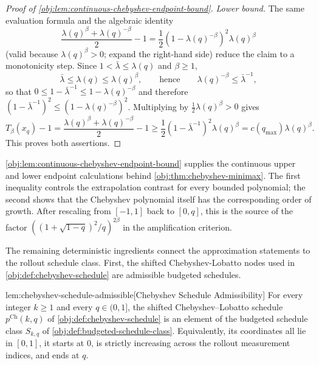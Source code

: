 \documentclass[11pt]{article}
\begin{document}
\begin{proof}[Proof of \cref{obj:lem:continuous-chebyshev-endpoint-bound}]
\emph{Lower bound.}
The same evaluation formula and the algebraic identity
\[
\frac{\lambda(q)^\beta+\lambda(q)^{-\beta}}2-1
=
\frac12\left(1-\lambda(q)^{-\beta}\right)^2\lambda(q)^\beta
\]
(valid because \(\lambda(q)^\beta>0\); expand the right-hand side) reduce the claim to a monotonicity step. Since \(1<\bar{\lambda}\le\lambda(q)\) and \(\beta\ge1\),
\[
\bar{\lambda}\le\lambda(q)\le\lambda(q)^\beta ,
\qquad\text{hence}\qquad
\lambda(q)^{-\beta}\le\bar{\lambda}^{-1},
\]
so that \(0\le 1-\bar{\lambda}^{-1}\le 1-\lambda(q)^{-\beta}\) and therefore \((1-\bar{\lambda}^{-1})^2\le\left(1-\lambda(q)^{-\beta}\right)^2\). Multiplying by \(\tfrac12\lambda(q)^\beta>0\) gives
\[
T_\beta(x_q)-1
=
\frac{\lambda(q)^\beta+\lambda(q)^{-\beta}}2-1
\ge
\frac12(1-\bar{\lambda}^{-1})^2\lambda(q)^\beta
=
c(q_{\max})\lambda(q)^\beta.
\] %
This proves both assertions. %
\end{proof}

\cref{obj:lem:continuous-chebyshev-endpoint-bound} supplies the continuous upper and lower endpoint calculations behind \cref{obj:thm:chebyshev-minimax}. The first inequality controls the extrapolation contrast for every bounded polynomial; the second shows that the Chebyshev polynomial itself has the corresponding order of growth. After rescaling from \([-1,1]\) back to \([0,q]\), this is the source of the factor \(((1+\sqrt{1-q})^2/q)^{2\beta}\) in the amplification criterion.

The remaining deterministic ingredients connect the approximation statements to the rollout schedule class. First, the shifted Chebyshev-Lobatto nodes used in \cref{obj:def:chebyshev-schedule} are admissible budgeted schedules.

\begin{lemmav}{lem:chebyshev-schedule-admissible}[Chebyshev Schedule Admissibility]
For every integer $k \ge 1$ and every $q \in (0,1]$, the shifted Chebyshev--Lobatto schedule $p^{\mathrm{Ch}}(k,q)$ of \cref{obj:def:chebyshev-schedule} is an element of the budgeted schedule class $S_{k,q}$ of \cref{obj:def:budgeted-schedule-class}. Equivalently, its coordinates all lie in $[0,1]$, it starts at $0$, is strictly increasing across the rollout measurement indices, and ends at $q$.
\end{lemmav}
\end{document}
